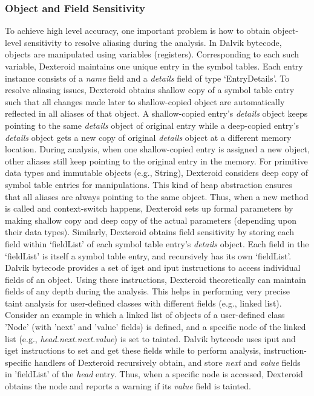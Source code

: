 \documentclass[10pt]{elsarticle}
\begin{document}
\subsubsection{Object and Field Sensitivity} \label{objSensitivity}

To achieve high level accuracy, one important problem is how to obtain object-level sensitivity to resolve aliasing during the analysis. In Dalvik bytecode, objects are manipulated using variables (registers). Corresponding to each such variable, Dexteroid maintains one unique entry in the symbol tables. Each entry instance consists of a \emph{name} field and a \emph{details} field of type `EntryDetails'. To resolve aliasing issues, Dexteroid obtains shallow copy of a symbol table entry such that all changes made later to shallow-copied object are automatically reflected in all aliases of that object. A shallow-copied entry's \emph{details} object keeps pointing to the same \emph{details} object of original entry while a deep-copied entry's \emph{details} object gets a new copy of original \emph{details} object at a different memory location. During analysis, when one shallow-copied entry is assigned a new object, other aliases still keep pointing to the original entry in the memory. For primitive data types and immutable objects (e.g., {\ttfamily String}), Dexteroid considers deep copy of symbol table entries for manipulations. This kind of heap abstraction ensures that all aliases are always pointing to the same object. Thus, when a new method is called and context-switch happens, Dexteroid sets up formal parameters by making shallow copy and deep copy of the actual parameters (depending upon their data types). Similarly, Dexteroid obtains field sensitivity by storing each field within `fieldList' of each symbol table entry's \emph{details} object. Each field in the `fieldList' is itself a symbol table entry, and recursively has its own `fieldList'. Dalvik bytecode \cite{DalvikByteCode} provides a set of {\ttfamily iget} and {\ttfamily iput} instructions to access individual fields of an object. Using these instructions, Dexteroid theoretically can maintain fields of any depth during the analysis. This helps in performing very precise taint analysis for user-defined classes with different fields (e.g., linked list). Consider an example in which a linked list of objects of a user-defined class 'Node' (with 'next' and 'value' fields) is defined,  and a specific node of the linked list (e.g., \emph{head.next.next.value}) is set to tainted. Dalvik bytecode uses {\ttfamily iput} and {\ttfamily iget} instructions to set and get these fields while to perform analysis, instruction-specific handlers of Dexteroid recursively obtain, and store \emph{next} and \emph{value} fields in 'fieldList' of the \emph{head} entry. Thus, when a specific node is accessed, Dexteroid obtains the node and reports a warning if its \emph{value} field is tainted.
\end{document}
